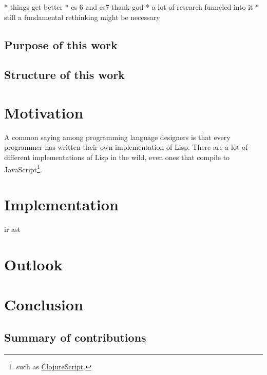 \documentclass[oneside,11pt,xetex]{scrbook}
\begin{document}
\begin{onehalfspace}
* things get better
* es 6 and es7 thank god
* a lot of research funneled into it
* still a fundamental rethinking might be necessary

\section{Purpose of this work}

\section{Structure of this work}

\chapter{Motivation}
\label{chap:motivation}

A common saying among programming language designers is that every programmer has written
their own implementation of Lisp. There are a lot of different implementations of Lisp
in the wild, even ones that compile to JavaScript\footnote{such as \href{https://github.com/clojure/clojurescript}{ClojureScript}.}.

\chapter{Implementation}
\label{chap:Implementation}

  \gls{ir} \gls{ast}


\chapter{Outlook}
\label{chap:outlook}


\chapter{Conclusion}
\label{chap:conclusion}


\section{Summary of contributions}
\label{sec:summary-of-contributions}


\end{onehalfspace}
\end{document}
